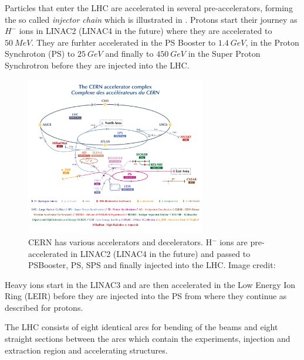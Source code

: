 Particles that enter the LHC are accelerated in several pre-accelerators, forming the so called
\emph{injector chain}\cite{Schindl1999} which is illustrated in .
Protons start their journey as $H^-$ ions in LINAC2 (LINAC4 in the future) where
they are accelerated to $\SI{50}{MeV}$. They are furhter accelerated in the PS Booster to $\SI{1.4}{GeV}$,
in the Proton Synchroton (PS) to $\SI{25}{GeV}$ and finally to $\SI{450}{GeV}$ in the Super Proton Synchrotron
before they are injected into the LHC.
%
\begin{figure}[h]
    \centering
    \includegraphics[width=0.7\textwidth]{CCC-v2019-final-white_small}
    \caption{CERN has various accelerators and decelerators. H$^-$ ions are pre-accelerated
    in LINAC2 (LINAC4 in the future) and passed to PSBooster, PS, SPS and finally injected into
    the LHC. Image credit: \cite{CERN_AccCmplx}}
    \label{fig_cern_acc_cmplx}
\end{figure}
%
Heavy ions start in the LINAC3 and are then accelerated in the Low Energy Ion Ring (LEIR) before they are injected into
the PS from where they continue as described for protons.

The LHC consists of eight identical arcs for bending of the beams and eight straight sections between the
arcs which contain the experiments, injection and extraction region and accelerating structures.

